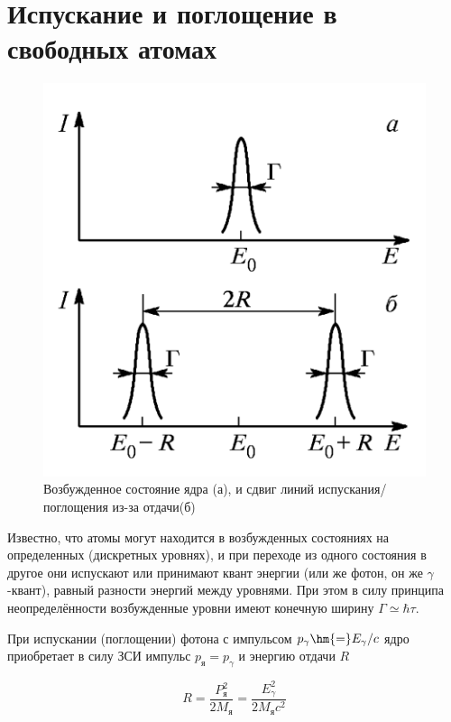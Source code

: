 \documentclass[12pt]{kiarticle}
\newcommand{\ga}{\ensuremath{\gamma}}
\begin{document}
\section{Испускание и поглощение в свободных атомах}

	\begin{figure}
	\includegraphics[width=\linewidth]{G}
	\caption{Возбужденное состояние ядра (а),
		и сдвиг линий испускания/поглощения из-за отдачи(б)}
	\label{ris 1}
\end{figure}

Известно, что атомы могут находится в возбужденных состояниях на определенных (дискретных уровнях), и при переходе из одного состояния в другое они испускают или принимают квант энергии (или же фотон, он же \ga-квант), равный разности энергий между уровнями. При этом в силу принципа неопределённости возбужденные уровни имеют конечную ширину $ \Gamma \simeq \hbar 
\tau $. 

При испускании (поглощении) фотона с импульсом $ p_\ga \hm{=} E_\ga / c $ ядро приобретает в силу ЗСИ импульс $ p_я = p_\ga $ и энергию отдачи $ R $ 

\begin{equation}\label{eq R}
R = \dfrac{P_я^2}{2M_я} = \dfrac{E_\ga^2}{2M_я c^2}
\end{equation}
\end{document}
